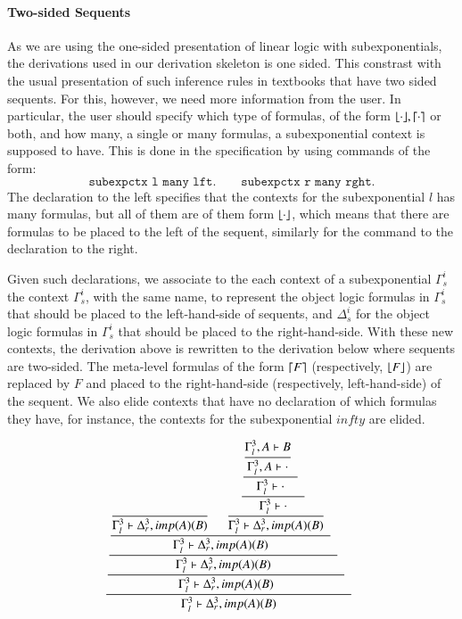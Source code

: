 \documentclass[a4paper,10pt]{article}
\begin{document}
\paragraph{Two-sided Sequents}
As we are using the one-sided presentation of linear logic with subexponentials, the derivations used 
in our derivation skeleton is one sided. This constrast with the usual presentation of such inference
rules in textbooks that have two sided sequents. For this, however, we need more information from the 
user. In particular, the user should specify which type of formulas, of the form $\lfloor \cdot \rfloor, \lceil \cdot \rceil$ or both, 
and how many, a single or many formulas, a subexponential context is supposed to have. 
This is done in the specification by using commands of the form:
\[
 \texttt{subexpctx l many lft.} \qquad
 \texttt{subexpctx r many rght.}
\]
The declaration to the left specifies that the contexts for the subexponential $l$ has many formulas, but 
all of them are of them form $\lfloor \cdot \rfloor$, which means that there are formulas to be placed to the left
of the sequent, similarly for the command to the declaration to the right.

Given such declarations, we associate to the each context of a subexponential $\Gamma_s^i$ the context
$\Gamma_s^i$, with the same name, to represent the object logic formulas in $\Gamma_s^i$ that should be 
placed to the left-hand-side of sequents, and $\Delta_s^i$ for the object logic formulas in  $\Gamma_s^i$
that should be placed to the right-hand-side. With these new contexts, the derivation above is rewritten 
to the derivation below where sequents are two-sided. The meta-level formulas of the form $\lceil F \rceil$ (respectively, 
$\lfloor F \rfloor$) are replaced by $F$ and placed to the right-hand-side (respectively, left-hand-side) of the sequent. 
We also elide contexts that have no declaration of which formulas they have, for instance, the contexts for the 
subexponential $infty$ are elided.

{\small\[\cfrac{\cfrac{\cfrac{\cfrac{\cfrac{}
{\Gamma_{l}^{3}  \vdash \Delta_{r}^{3}, imp (A) (B)  } \;\; 
\quad
\cfrac{\cfrac{\cfrac{\cfrac{\Gamma_{l}^{3}, A  \vdash B }
{\Gamma_{l}^{3}, A  \vdash  \cdot } \;\; }
{\Gamma_{l}^{3}  \vdash  \cdot } \;\; }
{\Gamma_{l}^{3}  \vdash  \cdot } \;\; }
{\Gamma_{l}^{3}  \vdash \Delta_{r}^{3}, imp (A) (B)  } \;\; }
{\Gamma_{l}^{3}  \vdash \Delta_{r}^{3}, imp (A) (B)  } \;\; }
{\Gamma_{l}^{3}  \vdash \Delta_{r}^{3}, imp (A) (B)  } \;\; }
{\Gamma_{l}^{3}  \vdash \Delta_{r}^{3}, imp (A) (B)  } \;\; }
{\Gamma_{l}^{3}  \vdash \Delta_{r}^{3}, imp (A) (B)  } \;\; \]}
\end{document}

